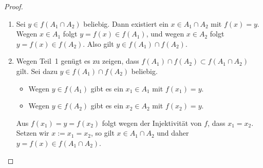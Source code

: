\begin{proof}
\begin{enumerate}
    \item Sei $y\in f(A_1\cap A_2)$ beliebig. Dann existiert ein $x\in A_1\cap A_2$ mit $f(x)=y$. Wegen $x\in A_1$ folgt $y=f(x)\in f(A_1)$, und wegen $x\in A_2$ folgt $y=f(x)\in f(A_2)$. Also gilt $y\in f(A_1)\cap f(A_2)$.

    \item Wegen Teil~1 genügt es zu zeigen, dass $f(A_1)\cap f(A_2)\subset f(A_1\cap A_2)$ gilt. Sei dazu $y\in f(A_1)\cap f(A_2)$ beliebig.
    \begin{itemize}
        \item Wegen $y\in f(A_1)$ gibt es ein $x_1\in A_1$ mit $f(x_1)=y$.
        \item Wegen $y\in f(A_2)$ gibt es ein $x_2\in A_2$ mit $f(x_2)=y$.
    \end{itemize}
    Aus $f(x_1)=y=f(x_2)$ folgt wegen der Injektivität von $f$, dass $x_1=x_2$. Setzen wir $x:=x_1=x_2$, so gilt $x\in A_1\cap A_2$ und daher $y=f(x)\in f(A_1\cap A_2)$. \qedhere
\end{enumerate}
\end{proof}
